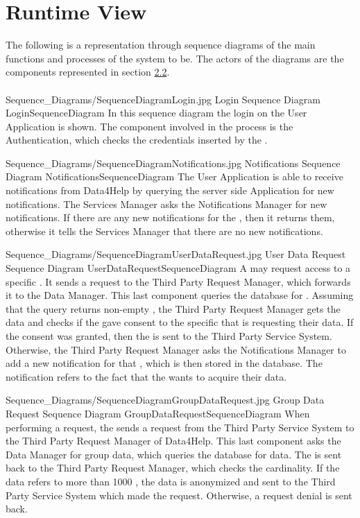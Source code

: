 \documentclass[../../DD.tex]{subfiles}
\begin{document}
\section{Runtime View\label{sect:2.4}}
\indent The following is a representation through sequence diagrams of the main functions and processes of the system to be. The actors of the diagrams are the components represented in section \hyperref[sect:2.2]{2.2}.\\ \\

	\image {13cm} {Sequence_Diagrams/SequenceDiagramLogin.jpg} {Login Sequence Diagram} {LoginSequenceDiagram}
	In this sequence diagram the  login on the User Application is shown. The component involved in the process is the Authentication, which checks the credentials inserted by the .

	\image {13cm} {Sequence_Diagrams/SequenceDiagramNotifications.jpg} {Notifications Sequence Diagram} {NotificationsSequenceDiagram}
	The User Application is able to receive notifications from Data4Help by querying the server side Application for new notifications. The Services Manager asks the Notifications Manager for new notifications. If there are any new notifications for the , then it returns them, otherwise it tells the Services Manager that there are no new notifications.

	\image {13cm} {Sequence_Diagrams/SequenceDiagramUserDataRequest.jpg} {User Data Request Sequence Diagram} {UserDataRequestSequenceDiagram}
	A  may request access to a specific . It sends a request to the Third Party Request Manager, which forwards it to the Data Manager. This last component queries the database for . Assuming that the query returns non-empty , the Third Party Request Manager gets the data and checks if the  gave consent to the specific  that is requesting their data. If the consent was granted, then the  is sent to the Third Party Service System. Otherwise, the Third Party Request Manager asks the Notifications Manager to add a new notification for that , which is then stored in the database. The notification refers to the fact that the  wants to acquire their data.

	\image {13cm} {Sequence_Diagrams/SequenceDiagramGroupDataRequest.jpg} {Group Data Request Sequence Diagram} {GroupDataRequestSequenceDiagram}
	When performing a  request, the  sends a request from the Third Party Service System to the Third Party Request Manager of Data4Help. This last component asks the Data Manager for group data, which queries the database for data. The  is sent back to the Third Party Request Manager, which checks the cardinality. If the data refers to more than 1000 , the data is anonymized and sent to the Third Party Service System which made the request. Otherwise, a request denial is sent back.
	
\end{document}
